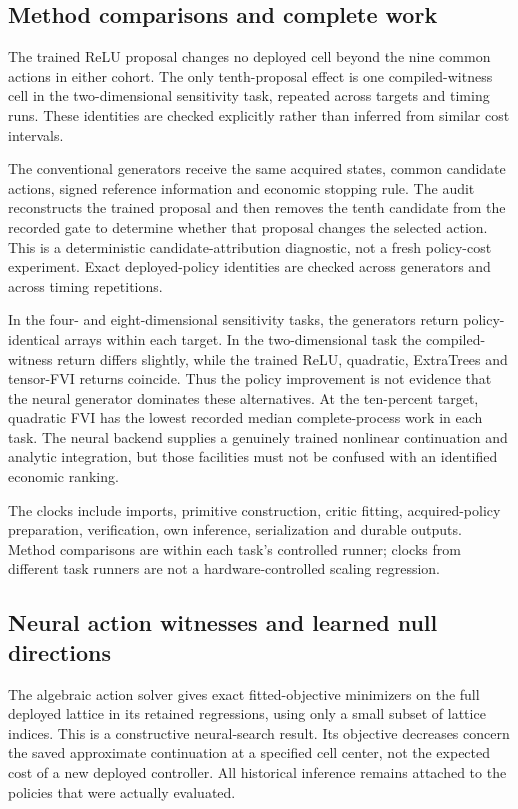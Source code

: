 \subsection{Method comparisons and complete work}

The trained ReLU proposal changes no deployed cell beyond the nine common actions in either cohort. The only tenth-proposal effect is one compiled-witness cell in the two-dimensional sensitivity task, repeated across targets and timing runs. These identities are checked explicitly rather than inferred from similar cost intervals.

The conventional generators receive the same acquired states, common candidate actions, signed reference information and economic stopping rule. The audit reconstructs the trained proposal and then removes the tenth candidate from the recorded gate to determine whether that proposal changes the selected action. This is a deterministic candidate-attribution diagnostic, not a fresh policy-cost experiment. Exact deployed-policy identities are checked across generators and across timing repetitions.

In the four- and eight-dimensional sensitivity tasks, the generators return policy-identical arrays within each target. In the two-dimensional task the compiled-witness return differs slightly, while the trained ReLU, quadratic, ExtraTrees and tensor-FVI returns coincide. Thus the policy improvement is not evidence that the neural generator dominates these alternatives. At the ten-percent target, quadratic FVI has the lowest recorded median complete-process work in each task. The neural backend supplies a genuinely trained nonlinear continuation and analytic integration, but those facilities must not be confused with an identified economic ranking.

The clocks include imports, primitive construction, critic fitting, acquired-policy preparation, verification, own inference, serialization and durable outputs. Method comparisons are within each task's controlled runner; clocks from different task runners are not a hardware-controlled scaling regression.

\subsection{Neural action witnesses and learned null directions}

The algebraic action solver gives exact fitted-objective minimizers on the full deployed lattice in its retained regressions, using only a small subset of lattice indices. This is a constructive neural-search result. Its objective decreases concern the saved approximate continuation at a specified cell center, not the expected cost of a new deployed controller. All historical inference remains attached to the policies that were actually evaluated.

